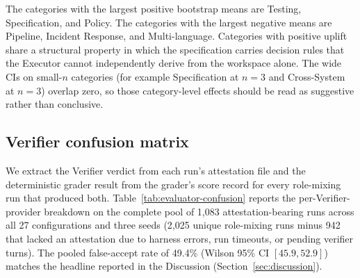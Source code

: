 \documentclass{article}
\begin{document}
The categories with the largest positive bootstrap means are Testing, Specification, and Policy. The categories with the largest negative means are Pipeline, Incident Response, and Multi-language. Categories with positive uplift share a structural property in which the specification carries decision rules that the Executor cannot independently derive from the workspace alone. The wide CIs on small-$n$ categories (for example Specification at $n{=}3$ and Cross-System at $n{=}3$) overlap zero, so those category-level effects should be read as suggestive rather than conclusive.

\subsection{Verifier confusion matrix}
\label{app:evaluator-confusion}

We extract the Verifier verdict from each run's attestation file and the deterministic grader result from the grader's score record for every role-mixing run that produced both. Table~\ref{tab:evaluator-confusion} reports the per-Verifier-provider breakdown on the complete pool of 1{,}083 attestation-bearing runs across all 27 configurations and three seeds (2{,}025 unique role-mixing runs minus 942 that lacked an attestation due to harness errors, run timeouts, or pending verifier turns). The pooled false-accept rate of 49.4\% (Wilson 95\% CI $[45.9, 52.9]$) matches the headline reported in the Discussion (Section~\ref{sec:discussion}).
\end{document}
